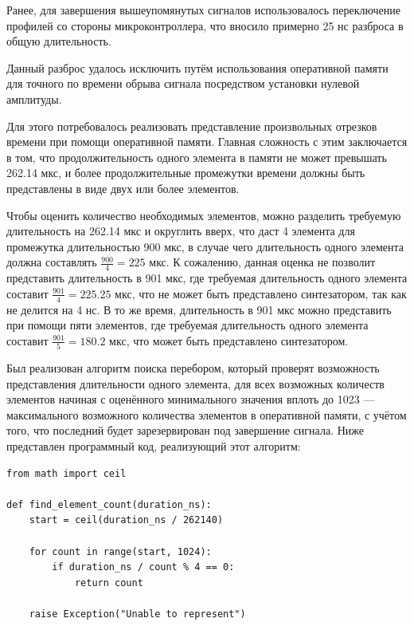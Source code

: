 \documentclass[rusmathsym, eqnumwithinsec, amspack, hyperref]{bomgost}
\begin{document}
Ранее, для завершения вышеупомянутых сигналов использовалось переключение профилей со стороны микроконтроллера, что вносило примерно 25 нс разброса в общую длительность.

Данный разброс удалось исключить путём использования оперативной памяти для точного по времени обрыва сигнала посредством установки нулевой амплитуды.

Для этого потребовалось реализовать представление произвольных отрезков времени при помощи оперативной памяти. Главная сложность с этим заключается в том, что продолжительность одного элемента в памяти не может превышать 262.14 мкс, и более продолжительные промежутки времени должны быть представлены в виде двух или более элементов.

Чтобы оценить количество необходимых элементов, можно разделить требуемую длительность на 262.14 мкс и округлить вверх, что даст 4 элемента для промежутка длительностью 900 мкс, в случае чего длительность одного элемента должна составлять $\frac{900}{4}=225$ мкс. К сожалению, данная оценка не позволит представить длительность в 901 мкс, где требуемая длительность одного элемента составит $\frac{901}{4}=225.25$ мкс, что не может быть представлено синтезатором, так как не делится на 4 нс. В то же время, длительность в 901 мкс можно представить при помощи пяти элементов, где требуемая длительность одного элемента составит $\frac{901}{5}=180.2$ мкс, что может быть представлено синтезатором.

Был реализован алгоритм поиска перебором, который проверят возможность представления длительности одного элемента, для всех возможных количеств элементов начиная с оценённого минимального значения вплоть до 1023 --- максимального возможного количества элементов в оперативной памяти, с учётом того, что последний будет зарезервирован под завершение сигнала. Ниже представлен программный код, реализующий этот алгоритм:

\lstset{
	language=python,
	basicstyle=\scriptsize\ttfamily,
	numbers=left,
	stepnumber=1,
	showstringspaces=false,
	tabsize=4,
	breaklines=true,
	breakatwhitespace=false,
	xleftmargin=.1\textwidth, xrightmargin=.1\textwidth,
	belowskip=1em, aboveskip=1em
}
\begin{lstlisting}
from math import ceil

def find_element_count(duration_ns):
	start = ceil(duration_ns / 262140)

	for count in range(start, 1024):
		if duration_ns / count % 4 == 0:
			return count

	raise Exception("Unable to represent")
\end{lstlisting}
\end{document}
